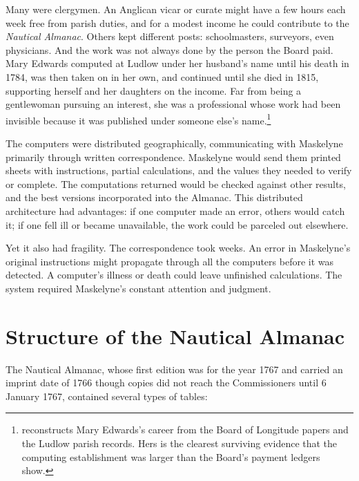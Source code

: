 Many were clergymen. An Anglican vicar or curate might have a few hours each week free from parish duties, and for a modest income he could contribute to the \emph{Nautical Almanac}. Others kept different posts: schoolmasters, surveyors, even physicians. And the work was not always done by the person the Board paid. Mary Edwards computed at Ludlow under her husband's name until his death in 1784, was then taken on in her own, and continued until she died in 1815, supporting herself and her daughters on the income. Far from being a gentlewoman pursuing an interest, she was a professional whose work had been invisible because it was published under someone else's name.\footnote{\textcite{CroarkenEdwards2003} reconstructs Mary Edwards's career from the Board of Longitude papers and the Ludlow parish records. Hers is the clearest surviving evidence that the computing establishment was larger than the Board's payment ledgers show.}

The computers were distributed geographically, communicating with Maskelyne primarily through written correspondence. Maskelyne would send them printed sheets with instructions, partial calculations, and the values they needed to verify or complete. The computations returned would be checked against other results, and the best versions incorporated into the Almanac. This distributed architecture had advantages: if one computer made an error, others would catch it; if one fell ill or became unavailable, the work could be parceled out elsewhere.

Yet it also had fragility. The correspondence took weeks. An error in Maskelyne's original instructions might propagate through all the computers before it was detected. A computer's illness or death could leave unfinished calculations. The system required Maskelyne's constant attention and judgment.

\section{Structure of the Nautical Almanac}

The Nautical Almanac, whose first edition was for the year 1767 and carried an imprint date of 1766 though copies did not reach the Commissioners until 6 January 1767, contained several types of tables:

